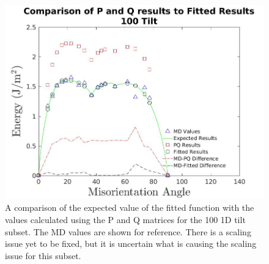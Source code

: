 \documentclass[twoside,senior]{BYUPhys}
\begin{document}
\begin{figure}[ht!]
 \centering
 \includegraphics[scale=0.26]{Images/100TiltPQvsMD}
 \caption[Comparison of the PQ matrices with the expected result for \textlangle{}100\textrangle{} tilt.]{\label{fig:100PQ} A comparison of the expected value of the fitted function with the values calculated using the P and Q matrices for the \textlangle{}100\textrangle{} 1D tilt subset.  The MD values are shown for reference.  There is a scaling issue yet to be fixed, but it is uncertain what is causing the scaling issue for this subset.}
\end{figure}
\end{document}
